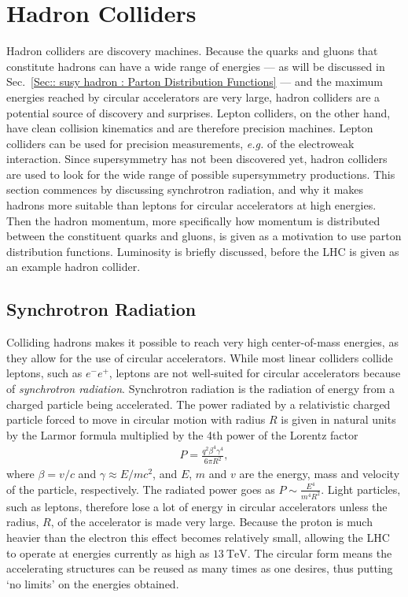 \documentclass[twoside,english]{uiofysmaster}
\begin{document}
{\section{Hadron Colliders}\label{Sec:: susy hadron : Hadron Colliders}

Hadron colliders are discovery machines. Because the quarks and gluons that constitute hadrons can have a wide range of energies --- as will be discussed in Sec.~\ref{Sec:: susy hadron : Parton Distribution Functions} --- and the maximum energies reached by circular accelerators are very large, hadron colliders are a potential source of discovery and surprises. Lepton colliders, on the other hand, have clean collision kinematics and are therefore precision machines. Lepton colliders can be used for precision measurements, \textit{e.g.} of the electroweak interaction. Since supersymmetry has not been discovered yet, hadron colliders are used to look for the wide range of possible supersymmetry productions. This section commences by discussing synchrotron radiation, and why it makes hadrons more suitable than leptons for circular accelerators at high energies. Then the hadron momentum, more specifically how momentum is distributed between the constituent quarks and gluons, is given as a motivation to use parton distribution functions. Luminosity is briefly discussed, before the LHC is given as an example hadron collider.  

\subsection{Synchrotron Radiation}

Colliding hadrons makes it possible to reach very high center-of-mass energies, as they allow for the use of circular accelerators. While most linear colliders collide leptons, such as $e^- e^+$, leptons are not well-suited for circular accelerators because of \textit{synchrotron radiation}. Synchrotron radiation is the radiation of energy from a charged particle being accelerated. The power radiated by a relativistic charged particle forced to move in circular motion with radius $R$ is given in natural units by the Larmor formula \cite{larmor1897lxiii} multiplied by the 4th power of the Lorentz factor
\begin{align}
P = \frac{q^2 \beta^4 \gamma^4}{6 \pi R^2},
\end{align}
where $\beta = v/c$ and $\gamma \approx E/mc^2$, and $E$, $m$ and $v$ are the energy, mass and velocity of the particle, respectively. The radiated power goes as $P \sim \frac{E^4}{m^4 R^2}$. Light particles, such as leptons, therefore lose a lot of energy in circular accelerators unless the radius, $R$, of the accelerator is made very large. Because the proton is much heavier than the electron this effect becomes relatively small, allowing the LHC to operate at energies currently as high as $13~\mathrm{TeV}$. The circular form means the accelerating structures can be reused as many times as one desires, thus putting `no limits' on the energies obtained. 

}
\end{document}
